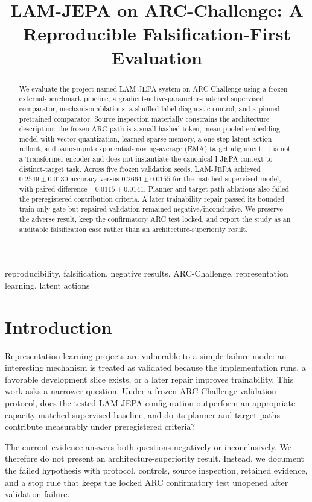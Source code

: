 \documentclass[conference]{IEEEtran}
\title{LAM-JEPA on ARC-Challenge: A Reproducible Falsification-First Evaluation}
\author{\IEEEauthorblockN{FIRST AUTHOR NAME}
\IEEEauthorblockA{\textit{High School Student, APPROVED AFFILIATION}\\
APPROVED CITY/COUNTRY\\
APPROVED EMAIL}}
\begin{document}
\maketitle

\begin{abstract}
We evaluate the project-named LAM-JEPA system on ARC-Challenge using a frozen external-benchmark pipeline, a gradient-active-parameter-matched supervised comparator, mechanism ablations, a shuffled-label diagnostic control, and a pinned pretrained comparator. Source inspection materially constrains the architecture description: the frozen ARC path is a small hashed-token, mean-pooled embedding model with vector quantization, learned sparse memory, a one-step latent-action rollout, and same-input exponential-moving-average (EMA) target alignment; it is not a Transformer encoder and does not instantiate the canonical I-JEPA context-to-distinct-target task. Across five frozen validation seeds, LAM-JEPA achieved $0.2549\pm0.0130$ accuracy versus $0.2664\pm0.0155$ for the matched supervised model, with paired difference $-0.0115\pm0.0141$. Planner and target-path ablations also failed the preregistered contribution criteria. A later trainability repair passed its bounded train-only gate but repaired validation remained negative/inconclusive. We preserve the adverse result, keep the confirmatory ARC test locked, and report the study as an auditable falsification case rather than an architecture-superiority result.
\end{abstract}

\begin{IEEEkeywords}
reproducibility, falsification, negative results, ARC-Challenge, representation learning, latent actions
\end{IEEEkeywords}

\section{Introduction}
Representation-learning projects are vulnerable to a simple failure mode: an interesting mechanism is treated as validated because the implementation runs, a favorable development slice exists, or a later repair improves trainability. This work asks a narrower question. Under a frozen ARC-Challenge validation protocol, does the tested LAM-JEPA configuration outperform an appropriate capacity-matched supervised baseline, and do its planner and target paths contribute measurably under preregistered criteria?

The current evidence answers both questions negatively or inconclusively. We therefore do not present an architecture-superiority result. Instead, we document the failed hypothesis with protocol, controls, source inspection, retained evidence, and a stop rule that keeps the locked ARC confirmatory test unopened after validation failure.
\end{document}
